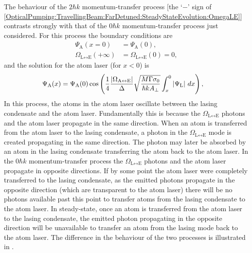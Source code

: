 The behaviour of the $2 \hbar k$ momentum-transfer process [the `$-$' sign of \eqref{OpticalPumping:TravellingBeam:FarDetuned:SteadyStateEvolution:OmegaLE}] contrasts strongly with that of the $0 \hbar k$ momentum-transfer process just considered.  For this process the boundary conditions are
\begin{subequations}
    \begin{align}
        \Psi_\text{A}(x=0) &= \Psi_\text{A}(0), \\
        \Omega_{\text{L} \leftrightarrow \text{E}}(+\infty) &= \Omega_{\text{L} \leftrightarrow \text{E}}(0) = 0,
    \end{align}
\end{subequations}
and the solution for the atom laser (for $x < 0$) is
\begin{align}
    \Psi_\text{A}(x) &= \Psi_\text{A}(0) \cos \left(\frac{1}{4} \frac{\left|\Omega_{\text{A} \leftrightarrow \text{E}}\right|}{\Delta} \sqrt{\frac{M \Gamma \sigma_0}{\hbar k A_\perp}} \int_{x}^{0} \left|\Psi_\text{L}\right| \, dx\right),
\end{align}
In this process, the atoms in the atom laser oscillate between the lasing condensate and the atom laser.  Fundamentally this is because the $\Omega_{\text{L} \leftrightarrow \text{E}}$ photons and the atom laser propagate in the same direction. When an atom is transferred from the atom laser to the lasing condensate, a photon in the $\Omega_{\text{L} \leftrightarrow \text{E}}$ mode is created propagating in the same direction.  The photon may later be absorbed by an atom in the lasing condensate transferring the atom back to the atom laser.  In the $0 \hbar k$ momentum-transfer process the $\Omega_{\text{L} \leftrightarrow \text{E}}$ photons and the atom laser propagate in opposite directions.   If by some point the atom laser were completely transferred to the lasing condensate, as the emitted photons propagate in the opposite direction (which are transparent to the atom laser) there will be no photons available past this point to transfer atoms from the lasing condensate to the atom laser.  In steady-state, once an atom is transferred from the atom laser to the lasing condensate, the emitted photon propagating in the opposite direction will be unavailable to transfer an atom from the lasing mode back to the atom laser.  The difference in the behaviour of the two processes is illustrated in .

